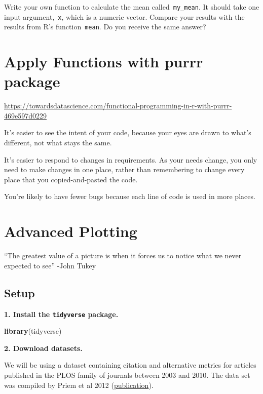 \documentclass[
]{book}
\newenvironment{Shaded}{\begin{snugshade}}{\end{snugshade}}
\newcommand{\KeywordTok}[1]{\textcolor[rgb]{0.13,0.29,0.53}{\textbf{#1}}}
\newcommand{\NormalTok}[1]{#1}
\begin{document}
Write your own function to calculate the mean called~\texttt{my\_mean}. It should take one input argument,~\texttt{x}, which is a numeric vector. Compare your results with the results from R's function~\texttt{mean}. Do you receive the same answer?

\hypertarget{apply-functions-with-purrr-package}{%
\chapter{Apply Functions with purrr package}\label{apply-functions-with-purrr-package}}

\url{https://towardsdatascience.com/functional-programming-in-r-with-purrr-469e597d0229}

It's easier to see the intent of your code, because your eyes are drawn to what's different, not what stays the same.

It's easier to respond to changes in requirements. As your needs change, you only need to make changes in one place, rather than remembering to change every place that you copied-and-pasted the code.

You're likely to have fewer bugs because each line of code is used in more places.

\hypertarget{advanced-plotting}{%
\chapter{Advanced Plotting}\label{advanced-plotting}}

``The greatest value of a picture is when it forces us to notice what we never expected to see''
-John Tukey

\hypertarget{setup}{%
\section{Setup}\label{setup}}

\textbf{1. Install the \texttt{tidyverse} package.}

\begin{Shaded}
\begin{Highlighting}[]
\KeywordTok{library}\NormalTok{(tidyverse)}
\end{Highlighting}
\end{Shaded}

\textbf{2. Download datasets.}

We will be using a dataset containing citation and alternative metrics for articles published in the PLOS family of journals between 2003 and 2010. The data set was compiled by Priem et al 2012 (\href{http://arxiv.org/abs/1203.4745}{publication}).
\end{document}
